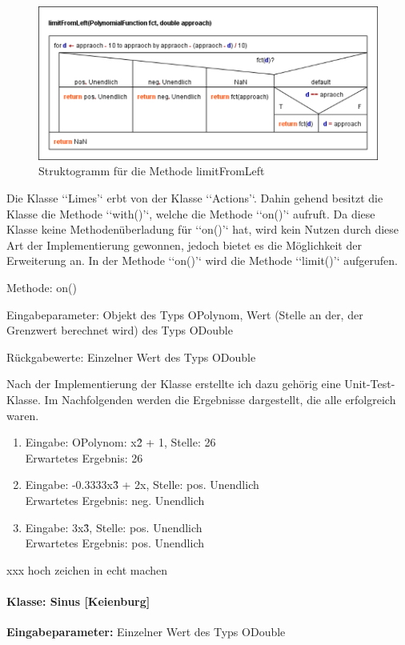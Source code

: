 \begin{figure}[!h]
	\includegraphics[scale=1]{img/struktogramm-limitFromLeft}
	\caption[Struktogramm für die Methode limitFromLeft]{Struktogramm für die Methode limitFromLeft\footnotemark}
\end{figure}

Die Klasse ‘‘Limes’‘ erbt von der Klasse ‘‘Actions’‘. Dahin gehend besitzt die Klasse die Methode ‘‘with()’‘, welche die Methode ‘‘on()’‘ aufruft. Da diese Klasse keine Methodenüberladung für ‘‘on()’‘ hat, wird kein Nutzen durch diese Art der Implementierung gewonnen, jedoch bietet es die Möglichkeit der Erweiterung an. In der Methode ‘‘on()’‘ wird die Methode ‘‘limit()’‘ aufgerufen.

Methode: on()

Eingabeparameter: Objekt des Typs OPolynom, Wert (Stelle an der, der Grenzwert berechnet wird) des Typs ODouble

Rückgabewerte: Einzelner Wert des Typs ODouble

Nach der Implementierung der Klasse erstellte ich dazu gehörig eine Unit-Test-Klasse. Im Nachfolgenden werden die Ergebnisse dargestellt, die alle erfolgreich waren.
\begin{enumerate}
	\item Eingabe: OPolynom: x\^2 + 1, Stelle: 26 \\
	Erwartetes Ergebnis: 26 
	\item Eingabe: -0.3333x\^3 + 2x, Stelle: pos. Unendlich \\
	Erwartetes Ergebnis: neg. Unendlich
	\item Eingabe: 3x\^3, Stelle: pos. Unendlich \\
	Erwartetes Ergebnis: pos. Unendlich
\end{enumerate}
xxx hoch zeichen in echt machen

\paragraph{Klasse: Sinus [Keienburg]}
\textbf{Eingabeparameter: } Einzelner Wert des Typs ODouble

